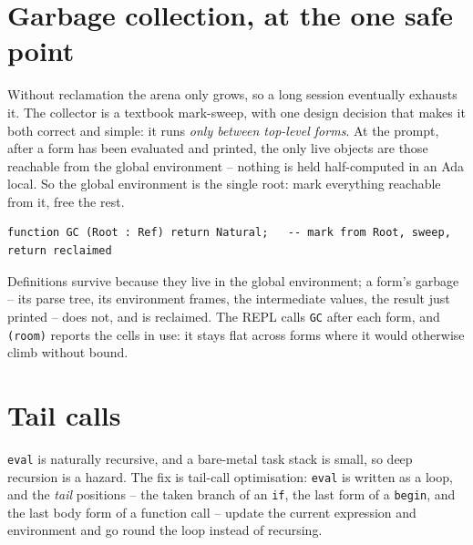 \section{Garbage collection, at the one safe point}

Without reclamation the arena only grows, so a long session eventually exhausts it.
The collector is a textbook mark-sweep, with one design decision that makes it both
correct and simple: it runs \emph{only between top-level forms}. At the prompt,
after a form has been evaluated and printed, the only live objects are those
reachable from the global environment -- nothing is held half-computed in an Ada
local. So the global environment is the single root: mark everything reachable from
it, free the rest.

\begin{lstlisting}
function GC (Root : Ref) return Natural;   -- mark from Root, sweep, return reclaimed
\end{lstlisting}

Definitions survive because they live in the global environment; a form's garbage
-- its parse tree, its environment frames, the intermediate values, the result just
printed -- does not, and is reclaimed. The REPL calls \texttt{GC} after each form,
and \texttt{(room)} reports the cells in use: it stays flat across forms where it
would otherwise climb without bound.


\section{Tail calls}

\texttt{eval} is naturally recursive, and a bare-metal task stack is small, so deep
recursion is a hazard. The fix is tail-call optimisation: \texttt{eval} is written
as a loop, and the \emph{tail} positions -- the taken branch of an \texttt{if}, the
last form of a \texttt{begin}, and the last body form of a function call -- update
the current expression and environment and go round the loop instead of recursing.

